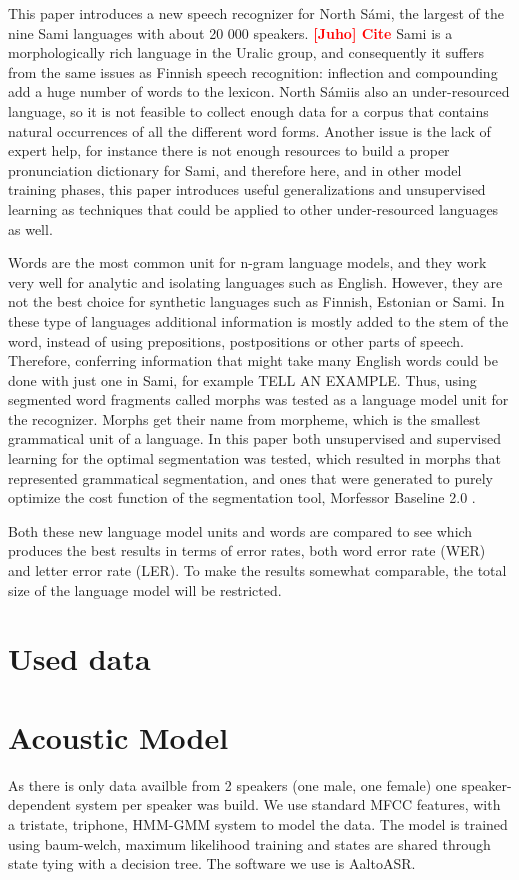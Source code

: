 \documentclass[b5paper]{article}
\newcommand{\todo}[2]{{\textcolor{red}{\bf [#1] #2 }}}
\newcommand{\ns}{{North Sámi}}
\begin{document}
This paper introduces a new speech recognizer for \ns, the largest of the nine Sami languages with about 20 000 speakers. \todo{Juho}{Cite}  Sami is a morphologically rich language in the Uralic group, and consequently it suffers from the same issues as Finnish speech recognition: inflection and compounding add a huge number of words to the lexicon. \ns is also an under-resourced language, so it is not feasible to collect enough data for a corpus that contains natural occurrences of all the different word forms. Another issue is the lack of expert help, for instance there is not enough resources to build a proper pronunciation dictionary for Sami, and therefore here, and in other model training phases, this paper introduces useful generalizations and unsupervised learning as techniques that could be applied to other under-resourced languages as well.

Words are the most common unit for n-gram language models, and they work very well for analytic and isolating languages such as English. However, they are not the best choice for synthetic languages such as Finnish, Estonian or Sami. In these type of languages additional information is mostly added to the stem of the word, instead of using prepositions, postpositions or other parts of speech. Therefore, conferring information that might take many English words could be done with just one in Sami, for example TELL AN EXAMPLE. Thus, using segmented word fragments called morphs was tested as a language model unit for the recognizer. Morphs get their name from morpheme, which is the smallest grammatical unit of a language. In this paper both unsupervised and supervised learning for the optimal segmentation was tested, which resulted in morphs that represented grammatical segmentation, and ones that were generated to purely optimize the cost function of the segmentation tool, Morfessor Baseline 2.0 \cite{virpioja2013morfessor}. 

Both these new language model units and words are compared to see which produces the best results in terms of error rates, both word error rate (WER) and letter error rate (LER). To make the results somewhat comparable, the total size of the language model will be restricted.

\section{Used data}


\section{Acoustic Model}
As there is only data availble from 2 speakers (one male, one female) one speaker-dependent system per speaker was build. We use standard MFCC features, with  a tristate, triphone, HMM-GMM system to model the data. The model is trained using baum-welch, maximum likelihood training and states are shared through state tying with a decision tree. The software we use is AaltoASR.
\end{document}
